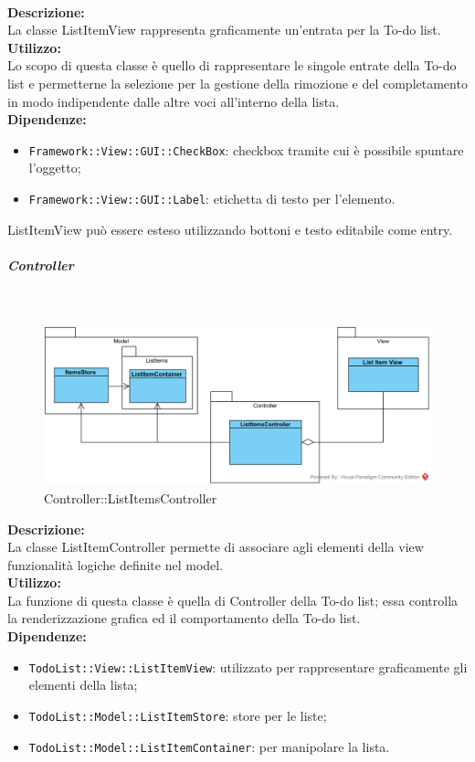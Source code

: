 \label{todo-view}\mbox{}\\
\textbf{Descrizione:}\\
La classe ListItemView rappresenta graficamente un'entrata per la To-do list.\\
\textbf{Utilizzo:}\\
Lo scopo di questa classe è quello di rappresentare le singole entrate della To-do list e permetterne la selezione per la gestione della rimozione e del completamento in modo indipendente dalle altre voci all'interno della lista.\\
\textbf{Dipendenze:}
\begin{itemize}
	\item \texttt{Framework::View::GUI::CheckBox}: checkbox tramite cui è possibile spuntare l'oggetto;
	\item \texttt{Framework::View::GUI::Label}: etichetta di testo per l'elemento.
\end{itemize}
ListItemView può essere esteso utilizzando bottoni e testo editabile come entry.


\subparagraph{Controller}\mbox{}
\begin{samepage}
	\label{todo-controller}\mbox{}\\
	\nopagebreak
	\begin{figure}[H]
		\centering
		\includegraphics[width=15cm]{diagrammi_img/classi_e_package/todo_controller}
		\caption{Controller\-::ListItemsController}
	\end{figure}
\end{samepage}
\textbf{Descrizione:}\\
La classe ListItemController permette di associare agli elementi della view funzionalità logiche definite nel model.\\
\textbf{Utilizzo:}\\
La funzione di questa classe è quella di Controller della To-do list; essa controlla la renderizzazione grafica ed il comportamento della To-do list.\\
\textbf{Dipendenze:}
\begin{itemize}
	\item \texttt{TodoList::View::ListItemView}: utilizzato per rappresentare graficamente gli elementi della lista;
	\item \texttt{TodoList::Model::ListItemStore}: store per le liste;
	\item \texttt{TodoList::Model::ListItemContainer}: per manipolare la lista.
\end{itemize}
